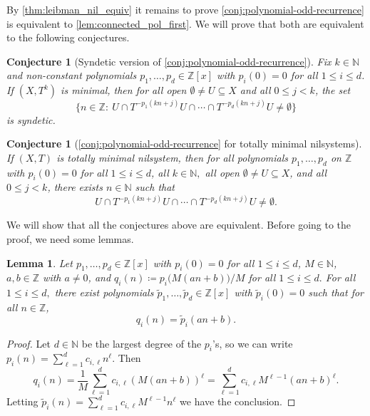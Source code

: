 \documentclass{article}
\theoremstyle{plain}
\newtheorem{lemma}[Theorem]{Lemma}
\newtheorem{Conjecture}[Theorem]{Conjecture}
\theoremstyle{claim}
\theoremstyle{definition}
\theoremstyle{plain}
\theoremstyle{plain}
\newcommand{\N}{\mathbb{N}}
\newcommand{\Z}{\mathbb{Z}}
\renewcommand{\leq}{\leqslant}
\newcommand{\1}{\boldsymbol{1}}
\newcommand{\defeq}{\coloneqq}
\begin{document}
\label{sec:all_equivalent_conjectures}


By \cref{thm:leibman_nil_equiv} it remains to prove \cref{conj:polynomial-odd-recurrence} is equivalent to \cref{lem:connected_pol_first}. We will prove that both are equivalent to the following conjectures.

\begin{Conjecture}[Syndetic version of \cref{conj:polynomial-odd-recurrence}]
\label{conj:polynomial-odd-recurrence-syndetic}
Fix $k\in \N$ and non-constant polynomials $p_1,\dots,p_d \in \Z[x]$ with $p_i(0) = 0$ for all $1 \le i \le d$. If $(X,T^k)$ is minimal, then for all open $\emptyset\neq U\subseteq X$ and all $0 \leq j < k$, the set
\[
\{ n \in \Z : \ U \cap T^{-p_1(kn+j)} U \cap \cdots \cap T^{-p_d(kn+j)} U \ne \emptyset \}
\]
is syndetic.
\end{Conjecture}


\begin{Conjecture}[\cref{conj:polynomial-odd-recurrence} for totally minimal nilsystems]
\label{conj:glasner-etal-totally-minimal}
If $(X,T)$ is totally minimal nilsystem, then for all polynomials $p_1,\dots,p_d$ on $\Z$ with $p_i(0)=0$ for all $1\leq i\leq d$, all $k\in \N,$ all open $\emptyset\neq U\subseteq X$, and all $0 \leq j < k$, there exists $n\in\N$ such that
\[
U \cap T^{-p_1(kn+j)}U\cap\cdots\cap T^{-p_d(kn+j)}U\neq\emptyset.
\]
\end{Conjecture}


We will show that all the conjectures above are equivalent. Before going to the proof, we need some lemmas.








\begin{lemma}\label{lem:change_polynomial}
    Let $p_1,\dots,p_d \in \Z[x]$ with $p_i(0)=0$ for all $1\leq i\leq d$, $M\in\N$, $a,b\in\Z$ with $a\neq 0$, and $q_i(n) \defeq p_i\big(M(an+b)\big)/M$ for all $1\leq i\leq d.$
    For all $1\leq i\leq d,$ there exist polynomials $\tilde p_1, \ldots, \tilde p_d \in \Z[x]$ with $\tilde p_i(0)=0$ such that for all $n \in \Z$,
    \[q_i(n)=\tilde p_i(an+b).\]
\end{lemma}



\begin{proof}
    Let $d\in\N$ be the largest degree of the $p_i$'s, so we can write $p_i(n)=\sum_{\ell=1}^dc_{i,\ell}n^\ell$.
    Then 
    $$q_i(n)
    =
    \frac1M\sum_{\ell=1}^dc_{i,\ell}(M(an+b))^\ell
    =
    \sum_{\ell=1}^dc_{i,\ell}M^{\ell-1}(an+b)^\ell.$$
    Letting $\tilde p_i(n)=\sum_{\ell=1}^dc_{i,\ell}M^{\ell-1}n^\ell$ we have the conclusion.
\end{proof}
\end{document}
